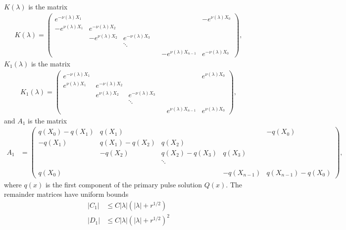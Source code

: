 \documentclass[thesis.tex]{subfiles}
\begin{document}
\begin{lemma}
$K(\lambda)$ is the matrix
\begin{align*}
K(\lambda) =  
\begin{pmatrix}
e^{-\nu(\lambda)X_1} & & & & & -e^{\nu(\lambda)X_0} \\
-e^{\nu(\lambda)X_1} & e^{-\nu(\lambda)X_2} \\
& -e^{\nu(\lambda)X_2} & e^{-\nu(\lambda)X_3} \\
  & & \ddots & && \\
& & & & -e^{\nu(\lambda)X_{n-1}} & e^{-\nu(\lambda)X_0}
\end{pmatrix},
\end{align*}
$K_1(\lambda)$ is the matrix
\begin{align*}
K_1(\lambda) =  
\begin{pmatrix}
e^{-\nu(\lambda)X_1} & & & & & e^{\nu(\lambda)X_0} \\
e^{\nu(\lambda)X_1} & e^{-\nu(\lambda)X_2} \\
& e^{\nu(\lambda)X_2} & e^{-\nu(\lambda)X_3} \\
 & & \ddots & &&   \\
& & & & e^{\nu(\lambda)X_{n-1}} & e^{\nu(\lambda)X_0}
\end{pmatrix},
\end{align*}
and $A_1$ is the matrix
\begin{align*}
A_1 &= \begin{pmatrix}
q(X_0) - q(X_1) & q(X_1) &&& -q(X_0) \\
-q(X_1) & q(X_1) - q(X_2) & q(X_2) \\
& -q(X_2) & q(X_2) - q(X_3) & q(X_3) \\ && \ddots \\
\\
q(X_0) &&& -q(X_{n-1}) & q(X_{n-1}) - q(X_0) 
\end{pmatrix},
\end{align*}
where $q(x)$ is the first component of the primary pulse solution $Q(x)$. The remainder matrices have uniform bounds
\begin{align}\label{centerjumprem}
|C_1| &\leq C |\lambda|(|\lambda| + r^{1/2}) \\
|D_1| &\leq C |\lambda|(|\lambda| + r^{1/2})^2
\end{align}


\end{lemma}
\end{document}
